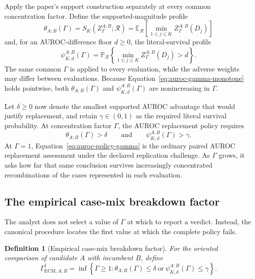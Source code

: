 \documentclass[11pt]{article}
\newcommand{\Regime}{\mathcal{R}}
\newcommand{\E}{\mathbb{E}}
\newcommand{\Prb}{\mathbb{P}}
\newtheorem{definition}{Definition}
\theoremstyle{remark}
\begin{document}
Apply the paper's support construction separately at every common concentration
factor. Define the supported-magnitude profile
\begin{equation}
\theta_{A:B}(\Gamma)
=
S_K(Z_\Gamma^{A:B};\Regime)
=
\E_{\Regime}
\left[
\min_{1\leq j\leq K}Z_\Gamma^{A:B}(D_j)
\right]
\label{eq:auroc-theta-gamma}
\end{equation}
and, for an AUROC-difference floor $d\geq0$, the literal-survival profile
\begin{equation}
\psi_{K,d}^{A:B}(\Gamma)
=
\Prb_{\Regime}
\left\{
\min_{1\leq j\leq K}Z_\Gamma^{A:B}(D_j)>d
\right\}.
\label{eq:auroc-psi-gamma}
\end{equation}
The same common $\Gamma$ is applied to every evaluation, while the adverse
weights may differ between evaluations. Because
Equation~\eqref{eq:auroc-gamma-monotone} holds pointwise, both
$\theta_{A:B}(\Gamma)$ and $\psi_{K,d}^{A:B}(\Gamma)$ are nonincreasing in
$\Gamma$.

Let $\delta\geq0$ now denote the smallest supported AUROC advantage that would
justify replacement, and retain $\gamma\in(0,1)$ as the required literal
survival probability. At concentration factor $\Gamma$, the AUROC replacement
policy requires
\begin{equation}
\theta_{A:B}(\Gamma)>\delta
\qquad\text{and}\qquad
\psi_{K,d}^{A:B}(\Gamma)>\gamma.
\label{eq:auroc-policy-gamma}
\end{equation}
At $\Gamma=1$, Equation~\eqref{eq:auroc-policy-gamma} is the ordinary paired
AUROC replacement assessment under the declared replication challenge. As
$\Gamma$ grows, it asks how far that same conclusion survives increasingly
concentrated recombinations of the cases represented in each evaluation.

\subsection{The empirical case-mix breakdown factor}

The analyst does not select a value of $\Gamma$ at which to report a verdict.
Instead, the canonical procedure locates the first value at which the complete
policy fails.

\begin{definition}[Empirical case-mix breakdown factor]
For the oriented comparison of candidate $A$ with incumbent $B$, define
\begin{equation}
\Gamma_{\mathrm{ECM},A:B}^{\dagger}
=
\inf\left\{
\Gamma\geq1:
\theta_{A:B}(\Gamma)\leq\delta
\ \text{or}\ 
\psi_{K,d}^{A:B}(\Gamma)\leq\gamma
\right\}.
\label{eq:auroc-ecm-breakdown}
\end{equation}
\end{definition}
\end{document}
